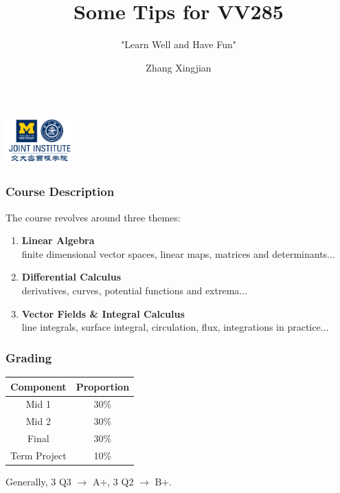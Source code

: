 \documentclass[UTF8]{beamer}
\title{Some Tips for \textbf{VV285}}
\subtitle{"Learn Well and Have Fun"}
\institute[UM-SJTU JI]{Univerity of Michigan-Shanghai Jiao Tong University Joint Institute}
\author{Zhang Xingjian}
\begin{document}
\begin{frame}
    \titlepage
    \begin{center}
        \includegraphics[height=2cm]{logo2.png}
    \end{center}
\end{frame}

\begin{frame}
    \frametitle{Course Description}
    The course revolves around three themes:
    \begin{enumerate}
        \item \textbf{Linear Algebra}\\
              finite dimensional vector spaces, linear maps, matrices and determinants...
        \item \textbf{Differential Calculus}\\
              derivatives, curves, potential functions and extrema...
        \item \textbf{Vector Fields \& Integral Calculus}\\
              line integrals, surface integral, circulation, flux, integrations in practice...
    \end{enumerate}
\end{frame}

\begin{frame}
    \frametitle{Grading}
    \begin{table}[ht]
        \begin{tabular}{cc}
            \hline
            Component    & Proportion \\ \hline
            Mid 1        & 30\%       \\
            Mid 2        & 30\%       \\
            Final        & 30\%       \\
            Term Project & 10\%       \\ \hline
        \end{tabular}
    \end{table}
    Generally, 3 Q3 $\rightarrow$ A+, 3 Q2 $\rightarrow$ B+.
\end{frame}
\end{document}
